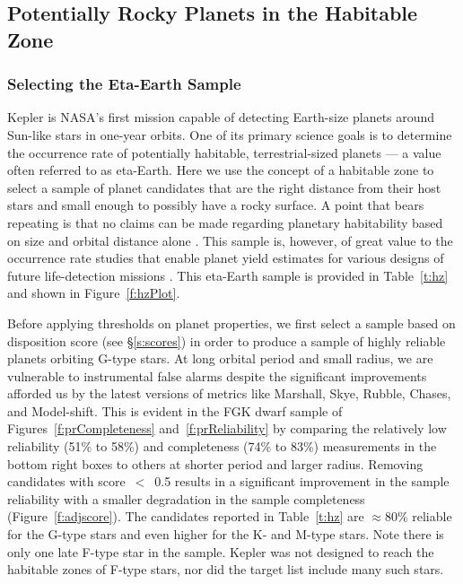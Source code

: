 \label{s:hz}
\subsection{Potentially Rocky Planets in the Habitable Zone}

\subsubsection{Selecting the Eta-Earth Sample}
Kepler is NASA's first mission capable of detecting Earth-size planets around Sun-like stars in one-year orbits.  One of its primary science goals is to determine the occurrence rate of potentially habitable, terrestrial-sized planets --- a value often referred to as eta-Earth.  Here we use the concept of a habitable zone to select a sample of planet candidates that are the right distance from their host stars and small enough to possibly have a rocky surface. A point that bears repeating is that no claims can be made regarding planetary habitability based on size and orbital distance alone \citep{Kane2012,Tasker2017}.   This sample is, however, of great value to the occurrence rate studies that enable planet yield estimates for various designs of future life-detection missions \citep{stark2015}. This eta-Earth sample is provided in Table~\ref{t:hz} and shown in Figure~\ref{f:hzPlot}.


Before applying thresholds on planet properties, we first select a sample based on disposition score (see \S\ref{s:scores}) in order to produce a sample of highly reliable planets orbiting G-type stars. At long orbital period and small radius, we are vulnerable to instrumental false alarms despite the significant improvements afforded us by the latest versions of metrics like Marshall, Skye, Rubble, Chases, and Model-shift. This is evident in the FGK dwarf sample of Figures~\ref{f:prCompleteness} and~\ref{f:prReliability} by comparing the relatively low reliability (51\% to 58\%) and completeness (74\% to 83\%) measurements in the bottom right boxes to others at shorter period and larger radius.  Removing candidates with score~$<$~0.5 results in a significant improvement in the sample reliability with a smaller degradation in the sample completeness (Figure~\ref{f:adjscore}).  The candidates reported in Table~\ref{t:hz} are $\approx$80\% reliable for the G-type stars and even higher for the K- and M-type stars. Note there is only one late F-type star in the sample.  Kepler was not designed to reach the habitable zones of F-type stars, nor did the target list include many such stars.


